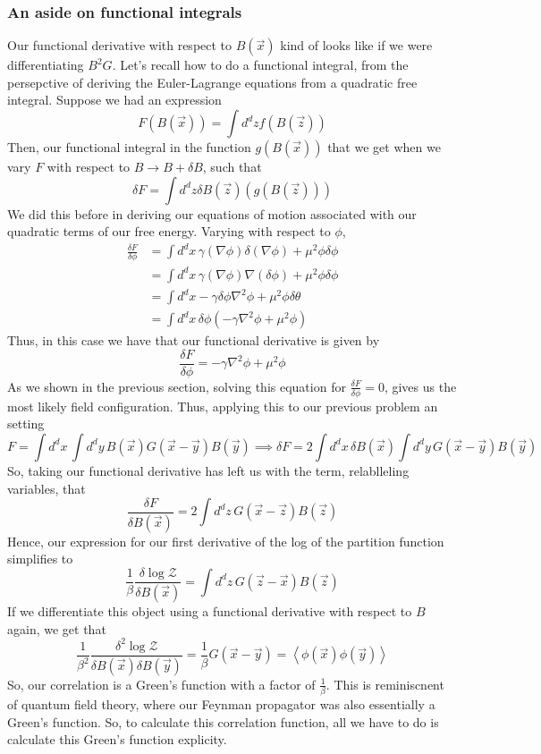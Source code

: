 \documentclass[11pt, oneside]{article}   	%
\begin{document}
\subsubsection{An aside on functional integrals} 
Our functional derivative with respect to $ B ( \vec{x} ) $ kind of looks like if we were differentiating
$ B ^2 G $. 
Let's recall how to do a functional integral, from the persepctive of deriving the 
Euler-Lagrange equations from a quadratic free integral. Suppose we had 
an expression 
\[
	F ( B ( \vec{x} ) ) = \int d^ d z f ( B ( \vec{z} ) ) 
\] Then, our functional integral in the function $ g ( B ( \vec{x} ) ) $ 
that we get when we vary $ F $ with respect to $ B \to B + \delta B $, such that 
 \[
	 \delta F = \int d^ d z \delta B ( \vec{z} ) ( g ( B ( \vec{z} ) ) ) 
\] We did this before in deriving our equations of motion associated 
with our quadratic terms of our free energy. Varying with respect to 
$ \phi $, 
\begin{align*}
	\frac{ \delta F }{ \delta \phi } &=  \int d^ d x \, \gamma ( \nabla  \phi ) \delta ( \nabla  \phi ) +\mu ^ 2   \phi \delta \phi  \\
					 &=  \int d^ d x \, \gamma ( \nabla  \phi ) \nabla  ( \delta \phi ) + \mu ^ 2  \phi \delta \phi \\
					 &= \int d^ d x  - \gamma \delta \phi \nabla ^ 2 \phi + \mu ^ 2 \phi \delta \theta \\
					 &=  \int d^ d x \, \delta \phi ( - \gamma \nabla  ^ 2 \phi + \mu ^ 2 \phi ) 
\end{align*} Thus, in this case 
we have that our functional derivative is given by 
\[
 \frac{ \delta F  }{ \delta \phi } = - \gamma \nabla  ^ 2 \phi + \mu ^ 2 \phi 
\] 
As we shown in the previous section, solving this equation for 
$ \frac{ \delta F }{ \delta \phi }  = 0 $, gives us the most likely field configuration.
Thus, applying this to our previous problem an setting 
\[
	F = \int d^ d x \, \int d^ d y \, B ( \vec{x} ) G ( \vec{x} - \vec{y} ) B ( \vec{y} ) \implies \delta F = 2 \int d^ d x \,  \delta B ( \vec{x} ) \int d^ d y \, G ( \vec{x} - \vec{y} ) B ( \vec{y} )  
\] So, taking our functional derivative has left us 
with the term, relablleling variables, that  
\[
	\frac{ \delta F }{ \delta B ( \vec{x} ) } = 2 \int d^ d z \, G ( \vec{x} - \vec{z}) B ( \vec{z} )  
\] Hence, our expression for our first derivative of the log of the 
partition function simplifies to 
\[
	\frac{1}{ \beta } \frac{ \delta \log \mathcal{ Z } }{ \delta B ( \vec{x} ) } = \int d^ d z \, G ( \vec{z} - \vec{x} ) B ( \vec{z} ) 
\] If we differentiate this object using a functional derivative with respect to 
$ B $ again, we get that 
\[
	\frac{1}{ \beta ^ 2 } \frac{ \delta ^ 2 \log \mathcal{ Z } }{ \delta B ( \vec{x} ) \delta B ( \vec{y} ) } = \frac{1}{ \beta } G ( \vec{x} - \vec{y} ) = \left< \phi ( \vec{x} ) \phi ( \vec{y} )  \right> 
\] So, our correlation is a Green's function 
with a factor of $ \frac{1}{ \beta  }$. This 
is reminiscnent of quantum field theory, where our Feynman propagator 
was also essentially a Green's function. 
So, to calculate this correlation function, all we have to do 
is calculate this Green's function explicity. 
\end{document}

